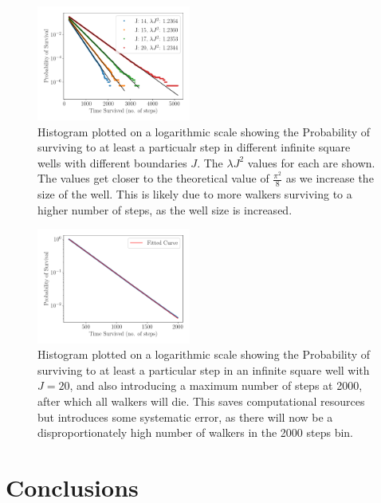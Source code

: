 \documentclass[journal]{IEEEtran}
\begin{document}
\begin{figure}[!ht]
  \begin{center}
    \includegraphics[width=0.45\textwidth]{images/multiplot.pdf}
    \caption{Histogram plotted on a logarithmic scale showing the Probability of
      surviving to at least a particualr step in different infinite square wells with
      different boundaries $J$. The $\lambda J^2$ values for each are shown. The
      values get closer to the theoretical value of $\frac{\pi^2}{8}$ as we increase
      the size of the well. This is likely due to more walkers surviving to a higher
      number of steps, as the well size is increased.}
    \label{fig:multi_line_plot}
  \end{center}
\end{figure}


\begin{figure}[!ht]
  \begin{center}
    \includegraphics[width=0.45\textwidth]{images/cum_line_plot_cutoff.pdf}
    \caption{Histogram plotted on a logarithmic scale showing the Probability of
      surviving to at least a particular step in an infinite square well with $J
      = 20$, and also introducing a maximum number of steps at 2000, after which
      all walkers will die. This saves computational resources but introduces
      some systematic error, as there will now be a disproportionately high
      number of walkers in the 2000 steps bin.}
    \label{fig:cum_line_cutoff_plot}
  \end{center}
\end{figure}

\section{Conclusions}
\end{document}
